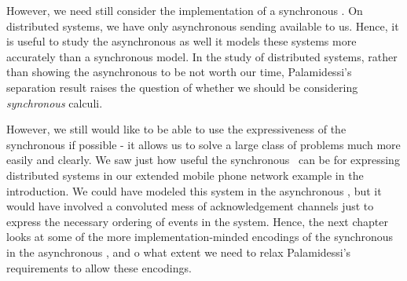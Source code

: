 However, we need still consider the implementation of a synchronous \picalc.  
On distributed systems, we have only asynchronous sending available to us.  
Hence, it is useful to study the asynchronous \picalc as well it models these systems more accurately than a synchronous model.
In the study of distributed systems, rather than showing the asynchronous to be not worth our time, Palamidessi's separation result raises the question of whether we should be considering \emph{synchronous} calculi. 

However, we still would like to be able to use the expressiveness of the synchronous \picalc if possible - it allows us to solve a large class of problems much more easily and clearly.
We saw just how useful the synchronous \picalc\ can be for expressing distributed systems in our extended mobile phone network example in the introduction.
We could have modeled this system in the asynchronous \picalc, but it would have involved a convoluted mess of acknowledgement channels just to express the necessary ordering of events in the system.
Hence, the next chapter looks at some of the more implementation-minded encodings of the synchronous \picalc in the asynchronous \picalc, and o what extent we need to relax Palamidessi's requirements to allow these encodings.
